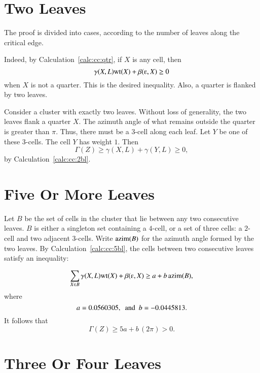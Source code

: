 \section{Two Leaves}

The proof is  divided into cases, according to the number of
leaves along the critical edge.

 Indeed, by
Calculation~\ref{calc:cc:qtr}, if $X$ is any cell,
then %
\[  
\gamma(X,L) \op{wt}(X) + \beta(\ee,X)\ge 0
\]  
when $X$ is not a quarter.  This is the desired inequality.  Also, a
quarter is flanked by two leaves.

Consider a cluster with exactly two leaves.
Without loss of generality, the two leaves flank a quarter
$X$. 
The azimuth angle of what remains outside the quarter
is greater than $\pi$.  Thus, there must be a $3$-cell
along each leaf.  Let $Y$ be one of these $3$-cells.
The cell $Y$ has weight $1$.
Then 
\begin{equation}\label{eqn:cc2bl} 
\Gamma(Z)\ge \gamma(X,L)+\gamma(Y,L)\ge 0,
\end{equation}
by Calculation~\ref{calc:cc:2bl}.
%
%

\section{Five Or More Leaves}

Let $B$ be the set of cells in the cluster that lie between any two
consecutive leaves.  $B$ is either a singleton set containing a
$4$-cell, or a set of three cells: a $2$-cell and two adjacent
$3$-cells.  Write ${\operatorname{azim}}(B)$ for the azimuth angle formed by the
two leaves.  By Calculation~\ref{calc:cc:5bl}, the cells between two
consecutive leaves satisfy an
inequality: %

\[  
\sum_{X\in B} \gamma(X,L)\op{wt}(X) + \beta(\ee,X) \ge a + b\,\op{azim}(B),
\] 
where
\[  
a= 0.0560305, \text{ \ and \ }   b= -0.0445813.
\] 
It follows that
\[  
\Gamma(Z) \ge 5 a + b\, (2\pi) > 0.
\] 

\section{Three Or Four Leaves}\label{sec:3or4}

